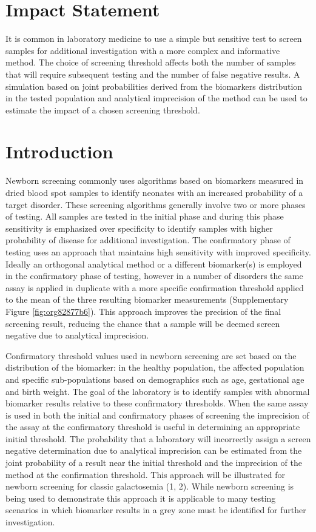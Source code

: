 \documentclass[review]{elsarticle}
\makeatletter
\newcommand{\citeprocitem}[2]{\hyper@linkstart{cite}{citeproc_bib_item_#1}#2\hyper@linkend}
\makeatother
\begin{document}
\section*{Impact Statement}
\label{sec:org03a1348}
It is common in laboratory medicine to use a simple but sensitive
test to screen samples for additional investigation with a more
complex and informative method. The choice of screening threshold
affects both the number of samples that will require subsequent
testing and the number of false negative results. A simulation based
on joint probabilities derived from the biomarkers distribution in
the tested population and analytical imprecision of the method can
be used to estimate the impact of a chosen screening threshold.

\section*{Introduction}
\label{sec:org2ae3058}
Newborn screening commonly uses algorithms based on biomarkers
measured in dried blood spot samples to identify neonates with an
increased probability of a target disorder. These screening algorithms
generally involve two or more phases of testing. All samples are
tested in the initial phase and during this phase sensitivity is
emphasized over specificity to identify samples with higher
probability of disease for additional investigation. The confirmatory
phase of testing uses an approach that maintains high sensitivity
with improved specificity. Ideally an orthogonal analytical method or
a different biomarker(s) is employed in the confirmatory phase of
testing, however in a number of disorders the same assay is applied in
duplicate with a more specific confirmation threshold applied to the
mean of the three resulting biomarker measurements (Supplementary Figure
\ref{fig:org82877b6}). This approach improves the precision of the final
screening result, reducing the chance that a sample will be deemed
screen negative due to analytical imprecision.

Confirmatory threshold values used in newborn screening are set based
on the distribution of the biomarker: in the healthy population, the
affected population and specific sub-populations based on demographics
such as age, gestational age and birth weight. The goal of the
laboratory is to identify samples with abnormal biomarker results
relative to these confirmatory thresholds. When the same assay is used
in both the initial and confirmatory phases of screening the
imprecision of the assay at the confirmatory threshold is useful in
determining an appropriate initial threshold. The probability that a
laboratory will incorrectly assign a screen negative determination due
to analytical imprecision can be estimated from the joint probability
of a result near the initial threshold and the imprecision of the
method at the confirmation threshold. This approach will be
illustrated for newborn screening for classic galactosemia
(\citeprocitem{1}{1}, \citeprocitem{2}{2}). While newborn screening is being
used to demonstrate this approach it is applicable to many testing
scenarios in which biomarker results in a grey zone must be identified
for further investigation.
\end{document}
